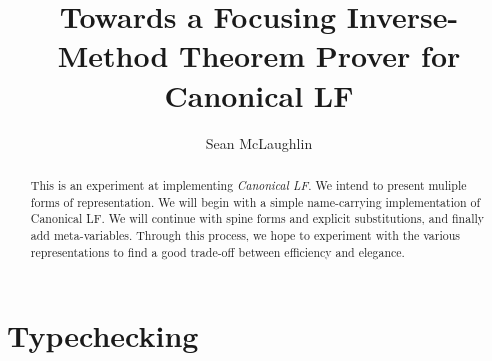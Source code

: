 \documentclass[11pt,twoside]{article}
\title{Towards a Focusing Inverse-Method Theorem Prover for Canonical LF}
\author{Sean McLaughlin}
\begin{document}
 
\maketitle

\arraycolsep=12pt


\begin{abstract} 
This is an experiment at implementing \emph{Canonical LF}.  We intend
to present muliple forms of representation.  We will begin with a
simple name-carrying implementation of Canonical LF.  We will continue
with spine forms and explicit substitutions, and finally add
meta-variables.  Through this process, we hope to experiment with the
various representations to find a good trade-off between efficiency
and elegance.
\end{abstract} 

\section{Typechecking}









\end{document}

